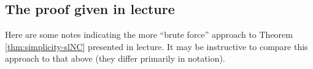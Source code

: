 \documentclass[reqno]{amsart} 
\begin{document}



\subsection{The proof given in lecture}
\label{sec:orgd32f640}
Here are some notes indicating the more ``brute force'' approach to Theorem \ref{thm:simplicity-slNC} presented in lecture.  It may be instructive to compare this approach to that above (they differ primarily in notation).
\end{document}
